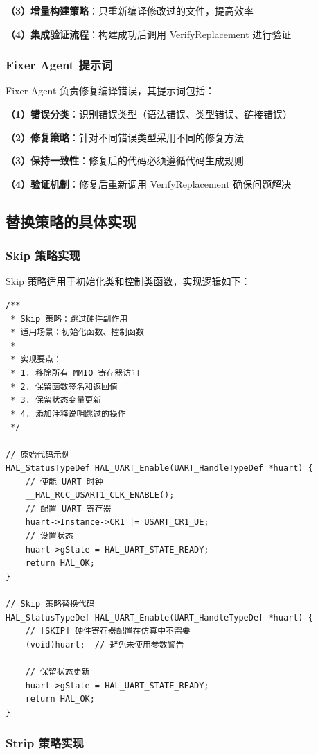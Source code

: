 \textbf{（3）增量构建策略}：只重新编译修改过的文件，提高效率

\textbf{（4）集成验证流程}：构建成功后调用 VerifyReplacement 进行验证

\subsubsection{Fixer Agent 提示词}

Fixer Agent 负责修复编译错误，其提示词包括：

\textbf{（1）错误分类}：识别错误类型（语法错误、类型错误、链接错误）

\textbf{（2）修复策略}：针对不同错误类型采用不同的修复方法

\textbf{（3）保持一致性}：修复后的代码必须遵循代码生成规则

\textbf{（4）验证机制}：修复后重新调用 VerifyReplacement 确保问题解决

\subsection{替换策略的具体实现}

\subsubsection{Skip 策略实现}

Skip 策略适用于初始化类和控制类函数，实现逻辑如下：

\begin{lstlisting}[style=CStyle,abovecaptionskip=0pt,belowcaptionskip=0pt]
/**
 * Skip 策略：跳过硬件副作用
 * 适用场景：初始化函数、控制函数
 *
 * 实现要点：
 * 1. 移除所有 MMIO 寄存器访问
 * 2. 保留函数签名和返回值
 * 3. 保留状态变量更新
 * 4. 添加注释说明跳过的操作
 */

// 原始代码示例
HAL_StatusTypeDef HAL_UART_Enable(UART_HandleTypeDef *huart) {
    // 使能 UART 时钟
    __HAL_RCC_USART1_CLK_ENABLE();
    // 配置 UART 寄存器
    huart->Instance->CR1 |= USART_CR1_UE;
    // 设置状态
    huart->gState = HAL_UART_STATE_READY;
    return HAL_OK;
}

// Skip 策略替换代码
HAL_StatusTypeDef HAL_UART_Enable(UART_HandleTypeDef *huart) {
    // [SKIP] 硬件寄存器配置在仿真中不需要
    (void)huart;  // 避免未使用参数警告
    
    // 保留状态更新
    huart->gState = HAL_UART_STATE_READY;
    return HAL_OK;
}
\end{lstlisting}

\subsubsection{Strip 策略实现}

